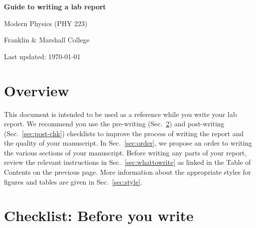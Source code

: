 \documentclass[12pt]{article}
\begin{document}
\begin{center}

  \vspace{5cm}

  {\LARGE \bf Guide to writing a lab report}

  \vspace{1cm}

  {\Large Modern Physics (PHY 223)}

  \vspace{10cm}

  {\Large Franklin \& Marshall College}

  \vspace{1cm}

  {\Large Last updated: \today}

\end{center}

\newpage

\hypertarget{contents}{}
\tableofcontents

\newpage

\section{Overview}

This document is intended to be used as a reference while you write
your lab report. We recommend you use the pre-writing (Sec.~\ref{sec:pre-chk}) 
and post-writing (Sec.~\ref{sec:post-chk})
checklists to improve the process of writing the report and the
quality of your manuscript. In Sec.~\ref{sec:order}, we propose an
order to writing the various sections of your manuscript. Before
writing any parts of your report, review the relevant instructions in 
Sec.~\ref{sec:whattowrite} as linked
 in the Table of Contents on the previous page.
More information about the appropriate styles for figures and tables are given
in Sec.~\ref{sec:style}.

\newpage

\section{Checklist: Before you write}
\label{sec:pre-chk}

\vspace{3mm}
\end{document}
